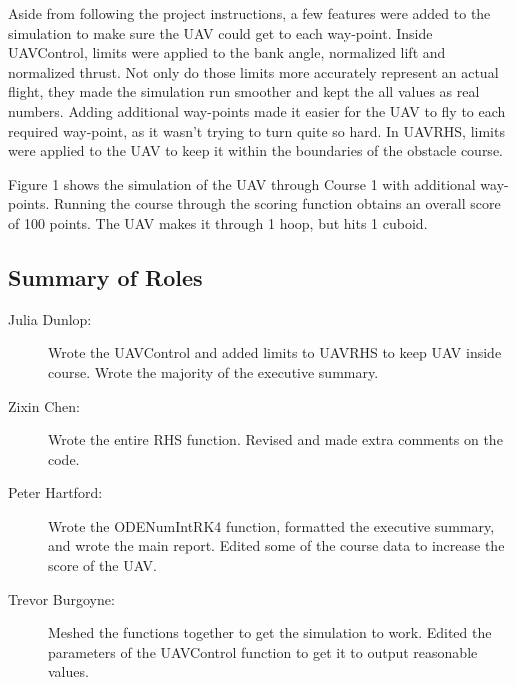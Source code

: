 \documentclass[12pt]{article}
\begin{document}
Aside from following the project instructions, a few features were added to the simulation to make sure the UAV could get to each way-point. Inside UAVControl, limits were applied to the bank angle, normalized lift and normalized thrust. Not only do those limits more accurately represent an actual flight, they made the simulation run smoother and kept the all values as real numbers. Adding additional way-points made it easier for the UAV to fly to each required way-point, as it wasn’t trying to turn quite so hard. In UAVRHS, limits were applied to the UAV to keep it within the boundaries of the obstacle course. 

Figure 1 shows the simulation of the UAV through Course 1 with additional way-points. Running the course through the scoring function obtains an overall score of 100 points. The UAV makes it through 1 hoop, but hits 1 cuboid. 	




\pagebreak
\subsection*{\centering Summary of Roles}  

\begin{description}
\item[Julia Dunlop:] Wrote the UAVControl and added limits to UAVRHS to keep UAV inside course. Wrote the majority of the executive summary. 

\item[Zixin Chen:] Wrote the entire RHS function. Revised and made extra comments on the code.

\item[Peter Hartford:] Wrote the ODENumIntRK4 function, formatted the executive summary, and wrote the main report. Edited some of the course data to increase the score of the UAV.

\item[Trevor Burgoyne:] Meshed the functions together to get the simulation to work. Edited the parameters of the UAVControl function to get it to output reasonable values.

\end{description}

\pagebreak  
\end{document}
